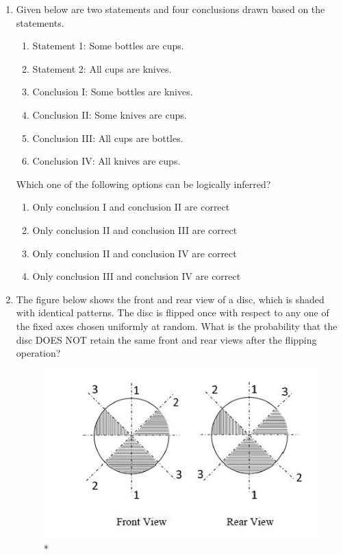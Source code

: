 \documentclass[journal,12pt,onecolumn]{IEEEtran}
\theoremstyle{remark}
\begin{document}
\begin{enumerate}
    
\item Given below are two statements and four conclusions drawn based on the statements.  

\begin{enumerate}

\item Statement 1: Some bottles are cups.  
\item Statement 2: All cups are knives.
\item Conclusion I: Some bottles are knives. 
\item Conclusion II: Some knives are cups.
\item Conclusion III: All cups are bottles.
\item Conclusion IV: All knives are cups. 

\end{enumerate}

Which one of the following options can be logically inferred?  

\hfill{}

\begin{enumerate}

\item Only conclusion I and conclusion II are correct  
\item Only conclusion II and conclusion III are correct  
\item Only conclusion II and conclusion IV are correct  
\item Only conclusion III and conclusion IV are correct  

\end{enumerate}
\item The figure below shows the front and rear view of a disc, which is shaded with identical patterns. The disc is flipped once with respect to any one of the fixed axes  chosen uniformly at random. What is the probability that the disc DOES NOT retain the same front and rear views after the flipping operation?

\hfill{}

\begin{figure}[h!]
\centering
\includegraphics[width = 0.85\columnwidth]{figs/q5.png}
\caption{*}
\label{fig:placeholder}
\end{figure}


\end{enumerate}
\end{document}
